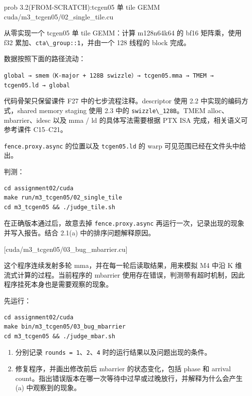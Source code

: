 \documentclass[11pt,a4paper,fontset=none]{ctexart}
\providecommand{\passthrough}[1]{#1}
\begin{document}
\begin{capstone}{prob 3.2(FROM-SCRATCH):tcgen05 单 tile GEMM \hfill {\footnotesize\ttfamily cuda/m3\_tcgen05/02\_single\_tile.cu}}

从零实现一个 tcgen05 单 tile GEMM：计算 m128n64k64 的 bf16 矩阵乘，使用
f32 累加、\passthrough{\lstinline!cta\_group::1!}，并由一个 128 线程的
block 完成。

数据按照下面的路径流动：

\passthrough{\lstinline!global → smem（K-major + 128B swizzle）→ tcgen05.mma → TMEM → tcgen05.ld → global!}

代码骨架只保留课件 F27 中的七步流程注释。descriptor 使用 2.2
中实现的编码方式，shared memory staging 使用 2.3 中的
\passthrough{\lstinline!swizzle\_128B!}。TMEM alloc、mbarrier、idesc
以及 mma / ld 的具体写法需要根据 PTX ISA 完成，相关语义可参考课件
C15--C21。

\passthrough{\lstinline!fence.proxy.async!} 的位置以及
\passthrough{\lstinline!tcgen05.ld!} 的 warp
可见范围已经在文件头中给出。

判测：

\begin{lstlisting}
cd assignment02/cuda
make run/m3_tcgen05/02_single_tile
cd m3_tcgen05 && ./judge_tile.sh
\end{lstlisting}

在正确版本通过后，故意去掉 \passthrough{\lstinline!fence.proxy.async!}
再运行一次，记录出现的现象并写入报告。结合 2.1(a) 中的排序问题解释原因。

\end{capstone}

[cuda/m3\_tcgen05/03\_bug\_mbarrier.cu]

这个程序连续发射多轮 mma，并在每一轮后读取结果，用来模拟 M4 中沿 K
维流式计算的过程。当前程序的 mbarrier
使用存在错误，判测带有超时机制，因此程序挂死本身也是需要观察的现象。

先运行：

\begin{lstlisting}
cd assignment02/cuda
make bin/m3_tcgen05/03_bug_mbarrier
cd m3_tcgen05 && ./judge_mbar.sh
\end{lstlisting}

\begin{enumerate}
\def\labelenumi{(\alph{enumi})}
\item
  分别记录
  \passthrough{\lstinline!rounds = 1!}、\passthrough{\lstinline!2!}、\passthrough{\lstinline!4!}
  时的运行结果以及问题出现的条件。
\item
  修复程序，并画出修改前后 mbarrier 的状态变化，包括 phase 和 arrival
  count。指出错误版本在哪一次等待中过早或过晚放行，并解释为什么会产生
  (a) 中观察到的现象。
\end{enumerate}
\end{document}
